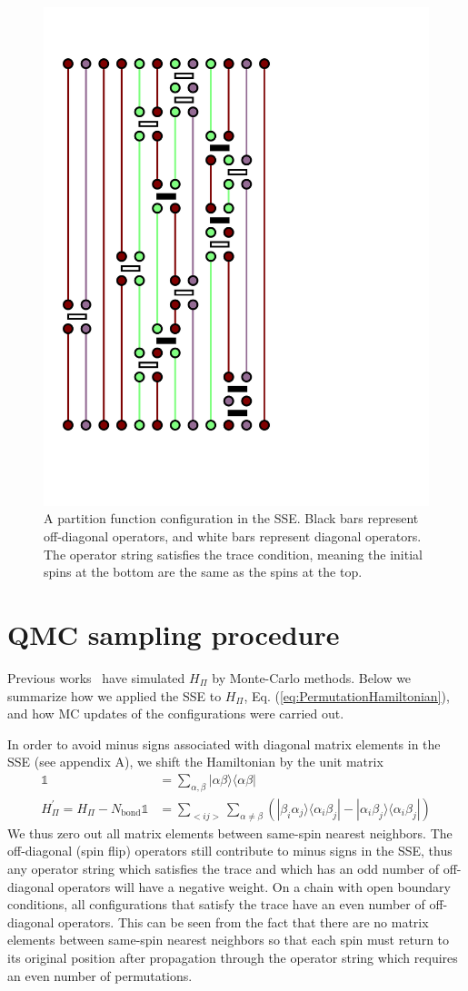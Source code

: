 \documentclass[aps,prb,reprint,floatfix]{revtex4-1}
\begin{document}
\begin{figure}
\centerline{\includegraphics[angle=0,width=.5\columnwidth]{Zconfig.pdf}}
\caption{A partition function configuration in the SSE.  Black bars represent off-diagonal operators, and white bars represent diagonal operators.  The operator string satisfies the trace condition, meaning the initial spins at the bottom are the same as the spins at the top.}
\label{fig:Zconfiguration}
\end{figure}

\section{QMC sampling procedure}\label{app_b}

Previous works~\cite{frischmuth1999:su4,Messio2012:entropyDep} have simulated $H_\Pi$ by Monte-Carlo methods. Below we summarize how we applied the SSE to $H_\Pi$, Eq. (\ref{eq:PermutationHamiltonian}), and how MC updates of the configurations were carried out. 

In order to avoid minus signs associated with diagonal matrix elements in the SSE (see appendix A), we shift the Hamiltonian by the unit matrix
{\allowdisplaybreaks
\begin{equation}
\begin{split}
		\mathds{1}&=\sum_{\alpha,\beta} |\alpha\beta\rangle\langle\alpha\beta| \\
		H^{'}_{\Pi} =H_{\Pi}-N_{\mathrm{bond}}\mathds{1}&= \sum_{<ij>}\sum_{\alpha\neq\beta}(|\beta_{i}\alpha_{j}\rangle\langle\alpha_{i}\beta_{j}|-|\alpha_{i}\beta_{j}\rangle\langle\alpha_{i}\beta_{j}|)  
\end{split}
\label{eq:ShiftedPermutationHamiltonian}
\end{equation}}
We thus zero out all matrix elements between same-spin nearest neighbors.  The off-diagonal (spin flip) operators still contribute to minus signs in the SSE, thus any operator string which satisfies the trace and which has an odd number of off-diagonal operators will have a negative weight.  On a chain with open boundary conditions, all configurations that satisfy the trace have an even number of off-diagonal operators.  This can be seen from the fact that there are no matrix elements between same-spin nearest neighbors so that each spin must return to its original position after propagation through the operator string which requires an even number of permutations.  
\end{document}
